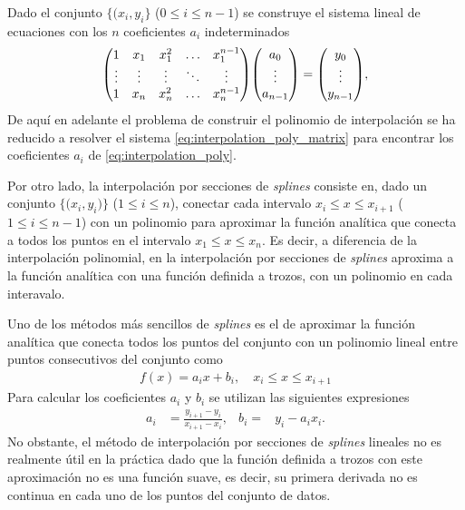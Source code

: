 \documentclass[11pt,letterpaper]{article}
\begin{document}
Dado el conjunto $\{\big(x_i,y_i\}$ ($0\leq i\leq n-1$) se construye el sistema 
lineal de ecuaciones con los $n$ coeficientes $a_i$ indeterminados
\begin{align}\label{eq:interpolation_poly_matrix}
\mqty(
1&x_1&x_1^2&\ldots&x_{1}^{n-1}\\
\vdots&\vdots&\vdots&\ddots&\vdots\\
1&x_n&x_n^2&\ldots&x_{n}^{n-1}\\)
\mqty(
a_0\\
\vdots\\
a_{n-1}
)
=
\mqty(
y_0\\
\vdots\\
y_{n-1}
),
\end{align}
De aquí en adelante el problema de construir el polinomio de interpolación
se ha reducido a resolver el sistema \eqref{eq:interpolation_poly_matrix} para
encontrar los coeficientes $a_i$ de \eqref{eq:interpolation_poly}. 

Por otro lado, la interpolación por secciones de \textit{splines} consiste en,
dado un conjunto $\{\big(x_i,y_i)\}$ ($1\leq i\leq n$), conectar
cada intervalo $x_i\leq x\leq x_{i+1}$ ($1\leq i \leq n-1$) con un polinomio
para aproximar la función analítica que conecta a todos los puntos en el intervalo
$x_1\leq x\leq x_n$. Es decir, a diferencia de la interpolación polinomial,
en la interpolación por secciones de \textit{splines} aproxima a la función
analítica con una función definida a trozos, con un polinomio en cada interavalo.

Uno de los métodos más sencillos de \textit{splines} es el de aproximar
la función analítica que conecta todos los puntos del conjunto con 
un polinomio lineal entre puntos consecutivos del conjunto como~\cite{cohen2011numerical}
\begin{align}
f(x)=a_ix+b_i,\quad x_i\leq x\leq x_{i+1}
\end{align}
Para calcular los coeficientes $a_i$ y $b_i$ se utilizan las siguientes expresiones
\begin{align}
a_i&=\frac{y_{i+1}-y_i}{x_{i+1}-x_i},& b_i=&y_i-a_ix_i.
\end{align}
No obstante, el método de interpolación por secciones de \textit{splines} lineales
no es realmente útil en la práctica dado que la función definida a trozos
con este aproximación no es una función suave, es decir, su primera derivada
no es continua en cada uno de los puntos del conjunto de datos.
\end{document}
